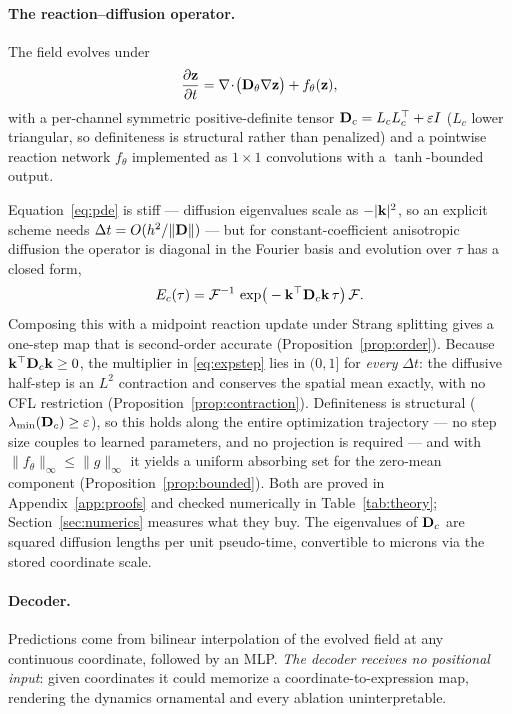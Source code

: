 \paragraph{The reaction--diffusion operator.}
The field evolves under
\begin{equation}
\frac{\partial \mathbf{z}}{\partial t}
  = \nabla \!\cdot\! \big(\mathbf{D}_\theta \nabla \mathbf{z}\big) + f_\theta(\mathbf{z}),
\label{eq:pde}
\end{equation}
with a per-channel symmetric positive-definite tensor
$\mathbf{D}_c = L_c L_c^\top + \varepsilon I$ ($L_c$ lower triangular, so definiteness is
structural rather than penalized) and a pointwise reaction network $f_\theta$
implemented as $1\times1$ convolutions with a $\tanh$-bounded output.

Equation~\eqref{eq:pde} is stiff --- diffusion eigenvalues scale as $-|\mathbf{k}|^2$,
so an explicit scheme needs $\Delta t = O(h^2/\|\mathbf{D}\|)$ --- but for
constant-coefficient anisotropic diffusion the operator is diagonal in the
Fourier basis and evolution over $\tau$ has a closed form,
\begin{equation}
E_c(\tau) = \mathcal{F}^{-1}\,
   \exp\!\big(-\mathbf{k}^\top \mathbf{D}_c \mathbf{k}\, \tau\big)\, \mathcal{F} .
\label{eq:expstep}
\end{equation}
Composing this with a midpoint reaction update under Strang splitting
\citep{strang1968splitting} gives a one-step map that is second-order accurate
(Proposition~\ref{prop:order}). Because $\mathbf{k}^\top\mathbf{D}_c\mathbf{k}\ge0$, the multiplier in
\eqref{eq:expstep} lies in $(0,1]$ for \emph{every} $\Delta t$: the diffusive
half-step is an $L^2$ contraction and conserves the spatial mean exactly, with no
CFL restriction (Proposition~\ref{prop:contraction}). Definiteness is structural
($\lambda_{\min}(\mathbf{D}_c)\ge\varepsilon$), so this holds along the entire
optimization trajectory --- no step size couples to learned parameters, and no
projection is required --- and with $\|f_\theta\|_\infty\le\|g\|_\infty$ it
yields a uniform absorbing set for the zero-mean component
(Proposition~\ref{prop:bounded}). Both are proved in Appendix~\ref{app:proofs}
and checked numerically in Table~\ref{tab:theory};
Section~\ref{sec:numerics} measures what they buy. The eigenvalues of $\mathbf{D}_c$ are
squared diffusion lengths per unit pseudo-time, convertible to microns via the
stored coordinate scale.

\paragraph{Decoder.}
Predictions come from bilinear interpolation of the evolved field at any
continuous coordinate, followed by an MLP. \emph{The decoder receives no
positional input}: given coordinates it could memorize a coordinate-to-expression
map, rendering the dynamics ornamental and every ablation uninterpretable.


